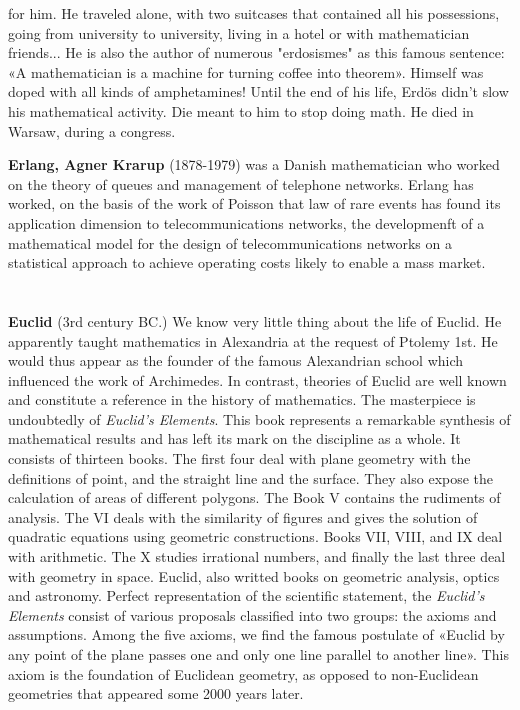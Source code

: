 for him. He traveled alone, with two suitcases that contained all his possessions, going from university to university, living in a hotel or with mathematician friends... He is also the author of numerous "erdosismes" as this famous sentence: «A mathematician is a machine for turning coffee into theorem». Himself was doped with all kinds of amphetamines! Until the end of his life, Erdös didn't slow his mathematical activity. Die meant to him to stop doing math. He died in Warsaw, during a congress.

\textbf{Erlang, Agner Krarup} (1878-1979) was a Danish mathematician who worked on the theory of queues and management of telephone networks. Erlang has worked, on the basis of the work of Poisson that law of rare events has found its application dimension to telecommunications networks, the developmenft of a mathematical model for the design of telecommunications networks on a statistical approach to achieve operating costs likely to enable a mass market.\\\\\\

\textbf{Euclid} (3rd century BC.) We know very little thing about the life of Euclid. He apparently taught mathematics in Alexandria at the request of Ptolemy 1st. He would thus appear as the founder of the famous Alexandrian school which influenced the work of Archimedes. In contrast, theories of Euclid are well known and constitute a reference in the history of mathematics. The masterpiece is undoubtedly of \textit{Euclid's Elements}. This book represents a remarkable synthesis of mathematical results and has left its mark on the discipline as a whole. It consists of thirteen books. The first four deal with plane geometry with the definitions of point, and the straight line and the surface. They also expose the calculation of areas of different polygons. The Book V contains the rudiments of analysis. The VI deals with the similarity of figures and gives the solution of quadratic equations using geometric constructions. Books VII, VIII, and IX deal with arithmetic. The X studies irrational numbers, and finally the last three deal with geometry in space. Euclid, also writted books on geometric analysis, optics and astronomy. Perfect representation of the scientific statement, the \textit{Euclid's Elements} consist of various proposals classified into two groups: the axioms and assumptions. Among the five axioms, we find the famous postulate of «Euclid by any point of the plane passes one and only one line parallel to another line». This axiom is the foundation of Euclidean geometry, as opposed to non-Euclidean geometries that appeared some 2000 years later.

